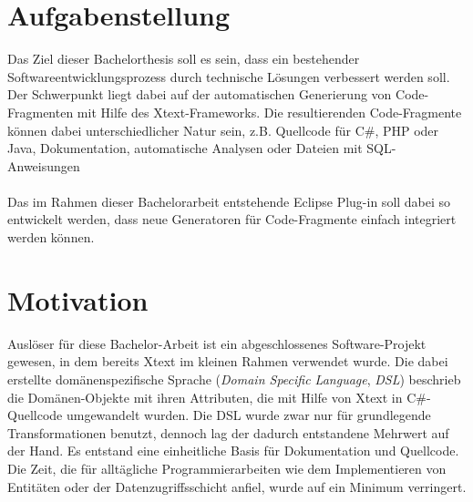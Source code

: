 \documentclass[a4paper,12pt]{scrreprt}
\begin{document}
\section{Aufgabenstellung}
Das Ziel dieser Bachelorthesis soll es sein, dass ein bestehender Softwareent\-wick\-lungs\-prozess durch technische Lösungen verbessert werden soll. Der Schwerpunkt liegt dabei auf der automatischen Generierung von Code-Fragmenten mit Hilfe des Xtext-Frameworks. 
Die resultierenden Code-Fragmente können dabei unterschiedlicher Natur sein, z.B. Quellcode für C\#, PHP oder Java, Dokumentation, automatische Analysen oder Dateien mit SQL-Anweisungen
\\
\\
Das im Rahmen dieser Bachelorarbeit entstehende Eclipse Plug-in soll dabei so entwickelt werden, dass neue Generatoren für Code-Fragmente einfach integriert werden können.
\section{Motivation}
Auslöser für diese Bachelor-Arbeit ist ein abgeschlossenes Software-Projekt gewesen, in dem bereits Xtext im kleinen Rahmen verwendet wurde.
Die dabei erstellte domänenspezifische Sprache (\textit{Domain Specific Language}, \textit{DSL}) beschrieb die Domänen-Objekte mit ihren Attributen, die mit Hilfe von Xtext in C\#-Quellcode umgewandelt wurden.
Die DSL wurde zwar nur für grundlegende Transformationen benutzt, dennoch lag der dadurch entstandene Mehrwert auf der Hand. Es entstand eine einheitliche Basis für Dokumentation und Quellcode. Die Zeit, die für alltägliche Programmierarbeiten wie dem Implementieren von Entitäten oder der Datenzugriffsschicht anfiel, wurde auf ein Minimum verringert.
\end{document}
